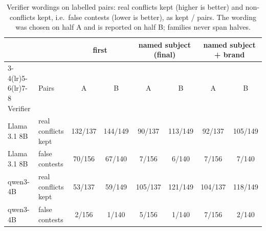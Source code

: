 \begin{table}[t]\centering\scriptsize
\caption{Verifier wordings on labelled pairs: real conflicts kept (higher is better) and non-conflicts kept, i.e.\ false contests (lower is better), as kept / pairs. The wording was chosen on half A and is reported on half B; families never span halves.}\label{tab:verifier}
\begin{tabular}{@{}llcccccc@{}}\toprule
& & \multicolumn{2}{c}{first} & \multicolumn{2}{c}{named subject (final)} & \multicolumn{2}{c}{named subject + brand} \\ \cmidrule(lr){3-4}\cmidrule(lr){5-6}\cmidrule(lr){7-8}
Verifier & Pairs & A & B & A & B & A & B \\ \midrule
Llama 3.1 8B & real conflicts kept & 132/137 & 144/149 & 90/137 & 113/149 & 92/137 & 105/149 \\
Llama 3.1 8B & false contests & 70/156 & 67/140 & 7/156 & 6/140 & 7/156 & 7/140 \\
qwen3-4B & real conflicts kept & 53/137 & 59/149 & 105/137 & 121/149 & 104/137 & 118/149 \\
qwen3-4B & false contests & 2/156 & 1/140 & 5/156 & 1/140 & 7/156 & 2/140 \\
\bottomrule\end{tabular}\end{table}
